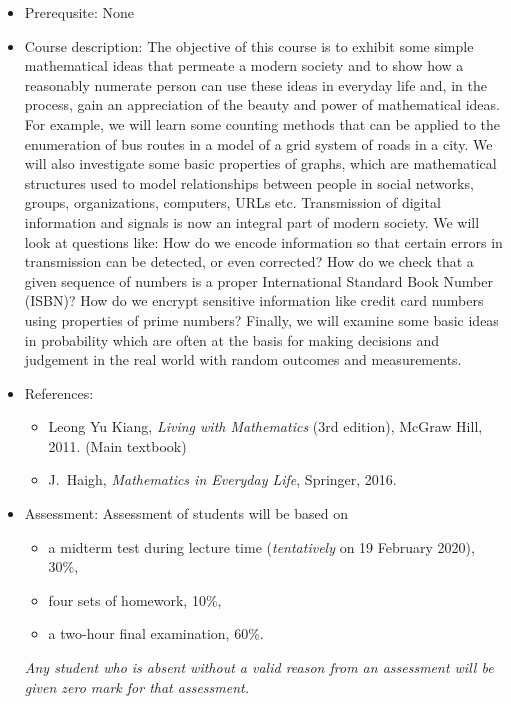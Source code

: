 \documentclass[a4paper]{article}
\begin{document}
\begin{itemize}
\item Prerequsite: None
  
\item Course description:  The objective of this course is to exhibit some simple mathematical ideas that permeate a modern society and to show how a reasonably numerate person can use these ideas in everyday life and, in the process, gain an appreciation of the beauty and power of mathematical ideas. For example, we will learn some counting methods that can be applied to the enumeration of bus routes in a model of a grid system of roads in a city. We will also investigate some basic properties of graphs, which are mathematical structures used to model relationships between people in social networks, groups, organizations, computers, URLs etc. Transmission of digital information and signals is now an integral part of modern society. We will look at questions like: How do we encode information so that certain errors in transmission can be detected, or even corrected? How do we check that a given sequence of numbers is a proper International Standard Book Number (ISBN)? How do we encrypt sensitive information like credit card numbers using properties of prime numbers? Finally, we will examine some basic ideas in probability which are often at the basis for making decisions and judgement in the real world with random outcomes and measurements.

\item References:
  \begin{itemize}
  \item
    Leong Yu Kiang, \emph{Living with Mathematics} (3rd edition), McGraw Hill, 2011. (Main textbook)
  \item    
    J.~Haigh, \emph{Mathematics in Everyday Life}, Springer, 2016.
  \end{itemize}
\item Assessment:
  Assessment of students will be based on
  \begin{itemize}
  \item a midterm test during lecture time (\emph{tentatively} on 19 February 2020), 30\%,
  \item four sets of homework, 10\%,
  \item a two-hour final examination, 60\%.
  \end{itemize}
  \emph{Any student who is absent without a valid reason from an assessment will be given zero mark for that assessment.}
\end{itemize}
\end{document}
